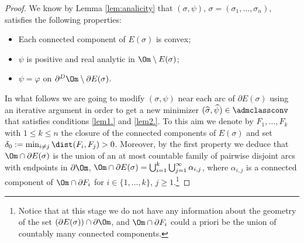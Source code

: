 \begin{proof}

We know by Lemma \ref{lem:analicity} that $(\sigma,\psi)$, $\sigma=(\sigma_1,\dots,\sigma_n)$, satisfies the following properties:
\begin{itemize}
\item
Each connected component of $E(\sigma)$ is convex;
\item $\psi$ is positive and real analytic
in $\Om\setminus E(\sigma)$;
\item $\psi=\varphi$ on $\partial^D\Om\setminus\partial E(\sigma)$.
\end{itemize}

In what follows we are going to modify $(\sigma,\psi)$ near each arc of $\partial E(\sigma)$ using an iterative argument in order to get a new minimizer $(\widehat\sigma,\widehat\psi)\in\admclassconv$ that satisfies conditions \ref{lem1.} and \ref{lem2.}. To this aim we denote by $F_1,\dots,F_k$ with $1\le k\le n$ the closure of the connected components of $E(\sigma)$ and set
$ \delta_0:=\min_{i\ne j}\dist(F_i,F_j)>0$. Moreover, by the first property we deduce that $\Om\cap\partial E(\sigma)$ is the union of an at most countable family of pairwise disjoint arcs with endpoints in $\partial\Om$, \ie $\Om\cap \partial E(\sigma)=
\bigcup_{i=1}^k\bigcup_{j=1}^\infty \alpha_{i,j}$, where $\alpha_{i,j}$ is a connected component of $\Om\cap\partial F_i$ for $i\in\{1,
\dots,k\}$, $j\ge1$.\footnote{Notice that at this stage we do not have any information about the geometry of the set $(\partial E(\sigma))\cap \partial\Om$, and $\Om\cap\partial F_i$ could a priori be the union of countably many connected components.}


\end{proof}
